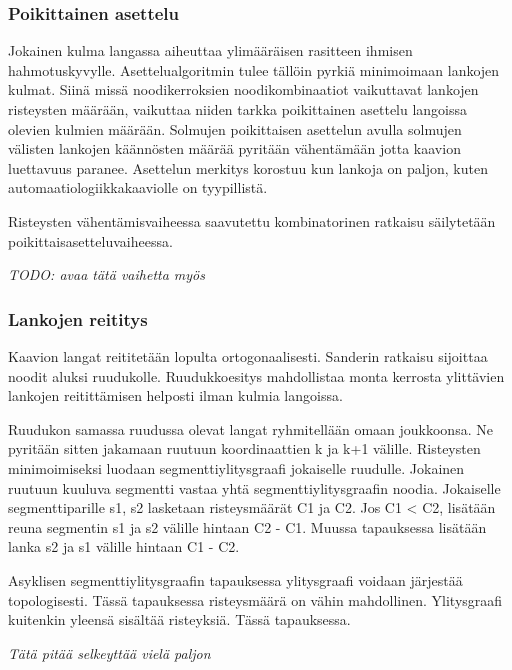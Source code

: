 \documentclass[finnish,12pt]{article}
\begin{document}
		\subsubsection{Poikittainen asettelu}

Jokainen kulma langassa aiheuttaa ylimääräisen rasitteen ihmisen hahmotuskyvylle. \cite{RefWorks:47}
Asettelualgoritmin tulee tällöin pyrkiä minimoimaan lankojen kulmat.
Siinä missä noodikerroksien noodikombinaatiot vaikuttavat lankojen risteysten määrään, vaikuttaa niiden tarkka poikittainen asettelu langoissa olevien kulmien määrään.
Solmujen poikittaisen asettelun avulla solmujen välisten lankojen käännösten määrää pyritään vähentämään jotta kaavion luettavuus paranee.
Asettelun merkitys korostuu kun lankoja on paljon, kuten automaatiologiikkakaaviolle on tyypillistä.

Risteysten vähentämisvaiheessa saavutettu kombinatorinen ratkaisu säilytetään poikittaisasetteluvaiheessa.

\emph{TODO: avaa tätä vaihetta myös}

		\subsubsection{Lankojen reititys}


Kaavion langat reititetään lopulta ortogonaalisesti.
Sanderin ratkaisu sijoittaa noodit aluksi ruudukolle.
Ruudukkoesitys mahdollistaa monta kerrosta ylittävien lankojen reitittämisen helposti ilman kulmia langoissa.

Ruudukon samassa ruudussa olevat langat ryhmitellään omaan joukkoonsa.
Ne pyritään sitten jakamaan ruutuun koordinaattien k ja k+1 välille.
Risteysten minimoimiseksi luodaan segmenttiylitysgraafi jokaiselle ruudulle. Jokainen ruutuun kuuluva segmentti vastaa yhtä segmenttiylitysgraafin noodia. Jokaiselle segmenttiparille s1, s2 lasketaan risteysmäärät C1 ja C2. Jos C1 < C2, lisätään reuna segmentin s1 ja s2 välille hintaan C2 - C1. Muussa tapauksessa lisätään lanka s2 ja s1 välille hintaan C1 - C2.

Asyklisen segmenttiylitysgraafin tapauksessa ylitysgraafi voidaan järjestää topologisesti. Tässä tapauksessa risteysmäärä on vähin mahdollinen. Ylitysgraafi kuitenkin yleensä sisältää risteyksiä. Tässä tapauksessa.\cite{RefWorks:17}

\emph{Tätä pitää selkeyttää vielä paljon}


	\clearpage
\end{document}

